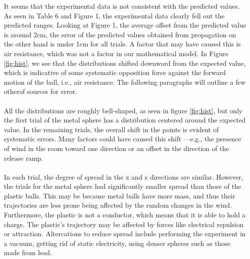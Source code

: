 \documentclass{article}
\begin{document}
%
%
%
%
%
It seems that the experimental data is not consistent with the predicted values. As seen in Table 6 and Figure 1, the experimental data clearly fell out the predicted ranges. Looking at Figure 1, the average offset from the predicted value is around 2\si{cm}, the error of the predicted values obtained from propagation on the other hand is under 1\si{cm} for all trials. A factor that may have caused this is air resistance, which was not a factor in our mathematical model. In Figure \ref{fig:hist}, we see that the distributions shifted downward from the expected value, which is indicative of some systematic opposition force against the forward motion of the ball, i.e., air resistance. The following paragraphs will outline a few otherof sources for error.\\\\
All the distributions are roughly bell-shaped, as seen in figure \ref{fig:hist}, but only the first trial of the metal sphere has a distribution centered around the expected value. In the remaining trials, the overall shift in the points is evident of systematic errors. Many factors could have caused this shift ---e.g., the presence of wind in the room toward one direction or an offset in the direction of the release ramp. 
\\\\
In each trial, the degree of spread in the x and z directions are similar. However, the trials for the metal sphere had significantly smaller spread than those of the plastic balls. This may be because metal balls have more mass, and thus their trajectories are less prone being affected by the random changes in the wind. Furthermore, the plastic is not a conductor, which means that it is able to hold a charge. The plastic's trajectory may be affected by forces like electrical repulsion or attraction. Altercations to reduce spread include performing the experiment in a vacuum, getting rid of static electricity, using denser spheres such as those made from lead. 
\end{document}
